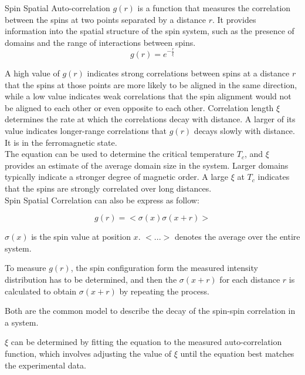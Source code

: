 Spin Spatial Auto-correlation $g(r)$ is a function that measures the correlation between the spins at two points separated by a distance $r$. It provides information into the spatial structure of the spin system, such as the presence of domains and the range of interactions between spins. \\ 

\begin{equation}
g(r) = e^{-\frac{r}{\xi}}
\end{equation}

A high value of $g(r)$ indicates strong correlations between spins at a distance $r$ that the spins at those points are more likely to be aligned in the same direction, while a low value indicates weak correlations that the spin alignment would not be aligned to each other or even opposite to each other. Correlation length $\xi$ determines the rate at which the correlations decay with distance. A larger of its value indicates longer-range correlations that $g(r)$ decays slowly with distance. It is in the ferromagnetic state. \\

The equation can be used to determine the critical temperature $T_c$, and $\xi$ provides an estimate of the average domain size in the system. Larger domains typically indicate a stronger degree of magnetic order. A large $\xi$ at $T_c$ indicates that the spins are strongly correlated over long distances. \\

Spin Spatial Correlation can also be express as follow:

\begin{equation}
g(r) = <\sigma(x)\sigma(x+r)>
\end{equation}

$\sigma(x)$ is the spin value at position $x$. $<...>$ denotes the average over the entire system.

To measure $g(r)$, the spin configuration form the measured intensity distribution has to be determined, and then the $\sigma(x+r)$ for each distance $r$ is calculated to obtain $\sigma(x+r)$ by repeating the process.

Both are the common model to describe the decay of the spin-spin correlation in a system.

$\xi$ can be determined by fitting the equation to the measured auto-correlation function, which involves adjusting the value of $\xi$ until the equation best matches the experimental data. \\

